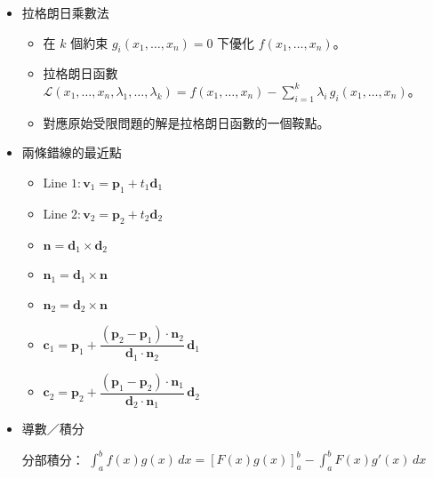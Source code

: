 \begin{itemize}
\begin{itemize}
  \item 球面被平面切下的一部分。
  \item $r$: 球半徑，$a$: 球冠底面半徑，$h$: 球冠高度，$\theta=\arcsin(a/r)$。
  \item 體積 $=\dfrac{\pi h^2(3r-h)}{3}=\dfrac{\pi h(3a^2+h^2)}{6}=\dfrac{\pi r^3(2+\cos\theta)(1-\cos\theta)^2}{3}$。
  \item 表面積 $=2\pi rh=\pi(a^2+h^2)=2\pi r^2(1-\cos\theta)$。
\end{itemize}

\item 拉格朗日乘數法

\begin{itemize}
  \item 在 $k$ 個約束 $g_i(x_1,\ldots,x_n)=0$ 下優化 $f(x_1,\ldots,x_n)$。
  \item 拉格朗日函數 $\mathcal{L}(x_1,\ldots,x_n,\lambda_1,\ldots,\lambda_k)=f(x_1,\ldots,x_n)-\sum_{i=1}^{k}\lambda_i\,g_i(x_1,\ldots,x_n)$。
  \item 對應原始受限問題的解是拉格朗日函數的一個鞍點。
\end{itemize}

\item 兩條錯線的最近點

\begin{itemize}
\item $\text{Line 1}: \boldsymbol{v}_1=\boldsymbol{p}_1+t_1\boldsymbol{d}_1$
\item $\text{Line 2}: \boldsymbol{v}_2=\boldsymbol{p}_2+t_2\boldsymbol{d}_2$
\item $\boldsymbol{n}=\boldsymbol{d}_1\times \boldsymbol{d}_2$
\item $\boldsymbol{n}_1=\boldsymbol{d}_1\times \boldsymbol{n}$
\item $\boldsymbol{n}_2=\boldsymbol{d}_2\times \boldsymbol{n}$
\item $\boldsymbol{c}_1=\boldsymbol{p}_1+\dfrac{(\boldsymbol{p}_2-\boldsymbol{p}_1)\cdot\boldsymbol{n}_2}{\boldsymbol{d}_1\cdot\boldsymbol{n}_2}\,\boldsymbol{d}_1$
\item $\boldsymbol{c}_2=\boldsymbol{p}_2+\dfrac{(\boldsymbol{p}_1-\boldsymbol{p}_2)\cdot\boldsymbol{n}_1}{\boldsymbol{d}_2\cdot\boldsymbol{n}_1}\,\boldsymbol{d}_2$
\end{itemize}

\item 導數／積分

分部積分：
\(\int_a^b f(x)g(x)\,dx=[F(x)g(x)]_a^b-\int_a^b F(x)g'(x)\,dx\)


\end{itemize}
